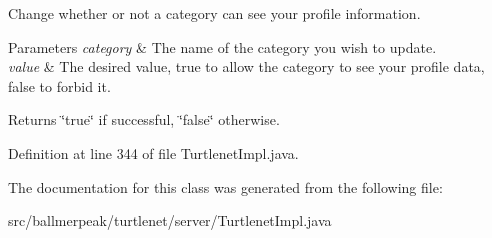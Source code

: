 Change whether or not a category can see your profile information. 


\begin{DoxyParams}{Parameters}
{\em category} & The name of the category you wish to update. \\
\hline
{\em value} & The desired value, true to allow the category to see your profile data, false to forbid it. \\
\hline
\end{DoxyParams}
\begin{DoxyReturn}{Returns}
\char`\"{}true\char`\"{} if successful, \char`\"{}false\char`\"{} otherwise. 
\end{DoxyReturn}


Definition at line 344 of file Turtlenet\-Impl.\-java.



The documentation for this class was generated from the following file\-:\begin{DoxyCompactItemize}
\item 
src/ballmerpeak/turtlenet/server/Turtlenet\-Impl.\-java\end{DoxyCompactItemize}
